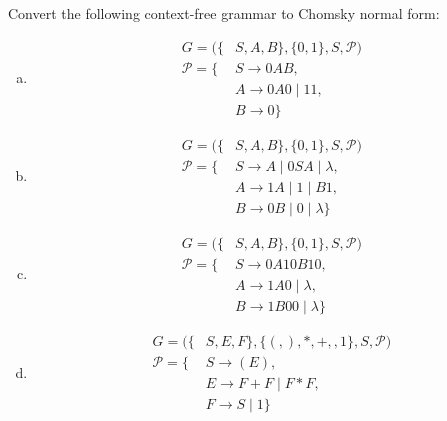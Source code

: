 \documentclass[a4paper,12pt]{amsart}
\begin{document}
    
\medskip\begin{problem}

    Convert the following context-free grammar to Chomsky normal form:
    \begin{multicols}{2}
        \begin{enumerate}[(a)]
    
            \item 
            \begin{align*}
            G=(\{&S,A,B\},\{0,1\},S,\mathcal P)\\
            \mathcal P=\{&S\rightarrow 0AB, \\
            &A\rightarrow 0A0\mid 11,\\
            &B\rightarrow 0\}
            \end{align*}
        
            \item 
            \begin{align*}
            G=(\{&S,A,B\},\{0,1\},S,\mathcal P)\\
            \mathcal P=\{&S\rightarrow A\mid 0SA\mid \lambda, \\
            &A\rightarrow 1A\mid 1\mid B1,\\
            &B\rightarrow 0B\mid 0\mid \lambda\} 
            \end{align*}
    
            \item 
            \begin{align*}
            G=(\{&S,A,B\},\{0,1\},S,\mathcal P)\\
            \mathcal P=\{
            &S\rightarrow 0A10B10, \\
            &A\rightarrow 1A0\mid \lambda,\\
            &B\rightarrow 1B00\mid \lambda\} 
            \end{align*}
    
            \item 
            \begin{align*}
            G=(\{&S,E,F\},\{(,),*,+,,1\},S,\mathcal P)\\
            \mathcal P=\{&
            S\rightarrow (E), \\
            &E\rightarrow F+F\mid F*F,\\
            &F\rightarrow S\mid 1\}
            \end{align*}

        \end{enumerate}
    \end{multicols}
        
\end{problem}
    
\end{document}
